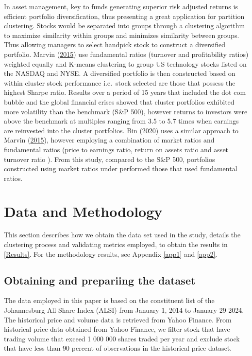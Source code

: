 \documentclass[11pt,preprint, authoryear]{elsarticle}
\numberwithin{equation}{section}
\numberwithin{figure}{section}
\numberwithin{table}{section}
\begin{document}
In asset management, key to funds generating superior risk adjusted
returns is efficient portfolio diversification, thus presenting a great
application for partition clustering. Stocks would be separated into
groups through a clustering algorithm to maximize similarity within
groups and minimizes similarity between groups. Thus allowing managers
to select handpick stock to construct a diversified portfolio. Marvin
(\protect\hyperlink{ref-marvin2015creating}{2015}) use fundamental
ratios (turnover and profitability ratios) weighted equally and K-means
clustering to group US technology stocks listed on the NASDAQ and NYSE.
A diversified portfolio is then constructed based on within cluster
stock performance i.e.~stock selected are those that possess the highest
Sharpe ratio. Results over a period of 15 years that included the dot
com bubble and the global financial crises showed that cluster
portfolios exhibited more volatility than the benchmark (S\&P 500),
however returns to investors were above the benchmark at multiples
ranging from 3.5 to 5.7 times when earnings are reinvested into the
cluster portfolios. Bin (\protect\hyperlink{ref-bin2020k}{2020}) uses a
similar approach to Marvin
(\protect\hyperlink{ref-marvin2015creating}{2015}), however employing a
combination of market ratios and fundamental ratios (price to earnings
ratio, return on assets ratio and asset turnover ratio ). From this
study, compared to the S\&P 500, portfolios constructed using market
ratios under performed those that used fundamental ratios.

\hypertarget{data-and-methodology}{%
\section{\texorpdfstring{Data and Methodology
\label{meth}}{Data and Methodology }}\label{data-and-methodology}}

This section describes how we obtain the data set used in the study,
details the clustering process and validating metrics employed, to
obtain the results in \ref{Results}. For the methodology results, see
Appendix \ref{app1} and \ref{app2}.

\hypertarget{obtaining-and-prepariing-the-dataset}{%
\subsection{Obtaining and prepariing the
dataset}\label{obtaining-and-prepariing-the-dataset}}

The data employed in this paper is based on the constituent list of the
Johannesburg All Share Index (ALSI) from January 1, 2014 to January 29
2024. The historical price and volume data is retrieved from Yahoo
Finance. From historical price data obtained from Yahoo Finance, we
filter stock that have trading volume that exceed 1 000 000 shares
traded per year and exclude stock that have less than 90 percent of
observations in the historical price dataset.
\end{document}
